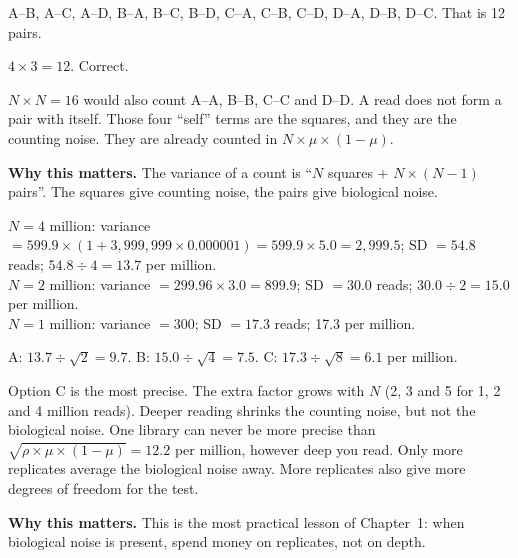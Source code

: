 \documentclass[12pt]{article}
\newcommand{\why}[1]{\par\smallskip\noindent\textcolor{barcsgreen!70!black}{\textbf{Why this matters.}} #1}
\begin{document}
\begin{exlist}[resume]
\item
\begin{parts}
\item A--B, A--C, A--D, B--A, B--C, B--D, C--A, C--B, C--D, D--A, D--B,
  D--C. That is 12 pairs.
\item $4 \times 3 = 12$. Correct.
\item $N \times N = 16$ would also count A--A, B--B, C--C and D--D. A read
  does not form a pair with itself. Those four ``self'' terms are the
  squares, and they are the counting noise. They are already counted in
  $N \times \mu \times (1-\mu)$.
\end{parts}
\why{The variance of a count is ``$N$ squares $+$ $N \times (N-1)$ pairs''.
The squares give counting noise, the pairs give biological noise.}

\item
\begin{parts}
\item $N = 4$ million: variance $= 599.9 \times (1 + 3{,}999{,}999 \times
  0.000001) = 599.9 \times 5.0 = 2{,}999.5$; SD $= 54.8$ reads; $54.8 \div 4
  = 13.7$ per million.\\
  $N = 2$ million: variance $= 299.96 \times 3.0 = 899.9$; SD $= 30.0$
  reads; $30.0 \div 2 = 15.0$ per million.\\
  $N = 1$ million: variance $= 300$; SD $= 17.3$ reads; 17.3 per million.
\item A: $13.7 \div \sqrt{2} = 9.7$. B: $15.0 \div \sqrt{4} = 7.5$. C:
  $17.3 \div \sqrt{8} = 6.1$ per million.
\item Option C is the most precise. The extra factor grows with $N$ (2, 3
  and 5 for 1, 2 and 4 million reads). Deeper reading shrinks the counting
  noise, but not the biological noise. One library can never be more precise
  than $\sqrt{\rho \times \mu \times (1-\mu)} = 12.2$ per million, however
  deep you read. Only more replicates average the biological noise away.
  More replicates also give more degrees of freedom for the test.
\end{parts}
\why{This is the most practical lesson of Chapter~1: when biological noise
is present, spend money on replicates, not on depth.}
\end{exlist}
\end{document}
